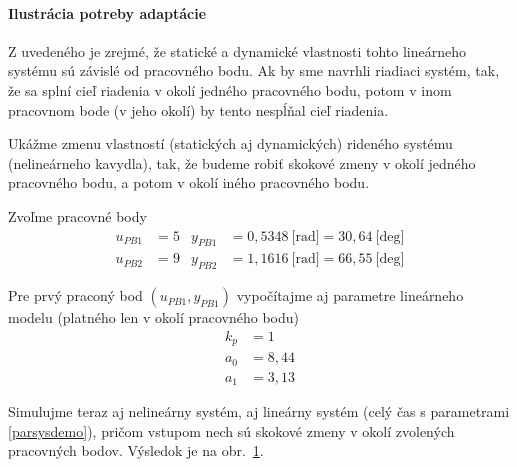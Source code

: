 \documentclass[a4paper, 10pt, ]{article}
\begin{document}
\paragraph{Ilustrácia potreby adaptácie}


Z uvedeného je zrejmé, že statické a dynamické vlastnosti tohto lineárneho systému sú závislé od pracovného bodu. Ak by sme navrhli riadiaci systém, tak, že sa splní cieľ riadenia v okolí jedného pracovného bodu, potom v inom pracovnom bode (v jeho okolí) by tento nespĺňal cieľ riadenia.

Ukážme zmenu vlastností (statických aj dynamických) rideného systému (nelineárneho kavydla), tak, že budeme robiť skokové zmeny v okolí jedného pracovného bodu, a potom v okolí iného pracovného bodu.

Zvoľme pracovné body
\begin{subequations}
    \begin{align}
        u_{PB1} &= 5 &       y_{PB1} &= 0,5348 \ \text{[rad]} = 30,64 \ \text{[deg]}\\
        u_{PB2} &= 9 &       y_{PB2} &= 1,1616 \ \text{[rad]} = 66,55 \ \text{[deg]}
    \end{align}
\end{subequations}

Pre prvý praconý bod $\left( u_{PB1}, y_{PB1} \right)$ vypočítajme aj parametre lineárneho modelu (platného len v okolí pracovného bodu)
\begin{subequations} \label{parsysdemo}
    \begin{align}
        k_p &= 1 \\
        a_0 &= 8,44 \\
        a_1 &= 3,13
    \end{align}
\end{subequations}



Simulujme teraz aj nelineárny systém, aj lineárny systém (celý čas s parametrami \eqref{parsysdemo}), pričom vstupom nech sú skokové zmeny v okolí zvolených pracovných bodov. Výsledok je na obr.~\ref{figsc_ar06_kyvadlo_ep1_1}.




\begin{figure}[!t]
	\centering

    \vspace{-3mm}




    \vspace{-2mm}

	\caption{}
	\label{figsc_ar06_kyvadlo_ep1_1}


    \vspace{-2mm}

\end{figure}
\end{document}
